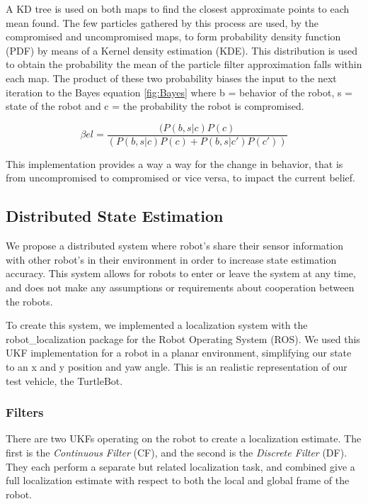 \documentclass[conference]{IEEEtran}
\begin{document}
A KD tree is used on both maps to find the closest approximate points to each mean found. The few particles gathered by this process are used, by the compromised and uncompromised maps, to form probability density function (PDF) by means of a Kernel density estimation (KDE). This distribution is used to obtain the probability the mean of the particle filter approximation falls within each map. The product of these two probability biases the input to the next iteration to the Bayes equation \ref{fig:Bayes} where b = behavior of the robot, s = state of the robot and c = the probability the robot is compromised.

\begin{equation}
 \beta el =\frac {(P(b,s|c)P(c)} {(P(b,s|c)P(c) + 
 P(b,s|c' )P(c' ))} 
 \label{fig:Bayes}
\end{equation}

This implementation provides a way a way for the change in behavior, that is from uncompromised to compromised or vice versa, to impact the current belief.


\subsection{Distributed State Estimation}
We propose a distributed system where robot's share their sensor information with other robot's in their environment in order to increase state estimation accuracy. This system allows for robots to enter or leave the system at any time, and does not make any assumptions or requirements about cooperation between the robots.

To create this system, we implemented a localization system with the robot\_localization \cite{Moore2014, Moore} package for the Robot Operating System (ROS). We used this UKF implementation for a robot in a planar environment, simplifying our state to an x and y position and yaw angle. This is an realistic representation of our test vehicle, the TurtleBot.
 
\subsubsection{Filters}
There are two UKFs operating on the robot to create a localization estimate. The first is the \textit{Continuous Filter} (CF), and the second is the \textit{Discrete Filter} (DF). They each perform a separate but related localization task, and combined give a full localization estimate with respect to both the local and global frame of the robot.
\end{document}

